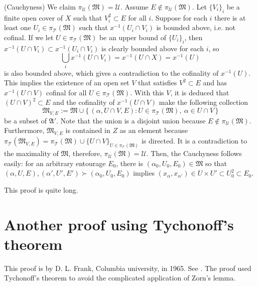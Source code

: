 \documentclass[11pt]{amsart}
\begin{document}
\begin{pf}[1 of Theorem 1.1]
(Cauchyness)
We claim $\pi_\mathcal{U}(\mathfrak{M})=\mathcal{U}$.
Assume $E\notin\pi_\mathcal{U}(\mathfrak{M})$.
Let $\{V_i\}_i$ be a finite open cover of $X$ such that $V_i^2\subset E$ for all $i$.
Suppose for each $i$ there is at least one $U_i\in\pi_\mathcal{T}(\mathfrak{M})$ such that $x^{-1}(U_i\cap V_i)$ is bounded above, i.e. not cofinal.
If we let $U\in\pi_\mathcal{T}(\mathfrak{M})$ be an upper bound of $\{U_i\}_i$, then $x^{-1}(U\cap V_i)\subset x^{-1}(U_i\cap V_i)$ is clearly bounded above for each $i$, so
\[\bigcup_ix^{-1}(U\cap V_i)=x^{-1}(U\cap X)=x^{-1}(U)\]
is also bounded above, which gives a contradiction to the cofinality of $x^{-1}(U)$.
This implies the existence of an open set $V$ that satisfies $V^2\subset E$ and has $x^{-1}(U\cap V)$ cofinal for all $U\in\pi_\mathcal{T}(\mathfrak{M})$.
With this $V$, it is deduced that $(U\cap V)^2\subset E$ and the cofinality of $x^{-1}(U\cap V)$ make the following collection
\[\mathfrak{M}_{V,E}:=\mathfrak{M}\cup\{\,(\alpha,U\cap V,E):U\in\pi_\mathcal{T}(\mathfrak{M}),\ \alpha\in U\cap V\,\}\]
be a subset of $\mathfrak{A}'$.
Note that the union is a disjoint union because $E\notin\pi_\mathcal{U}(\mathfrak{M})$.
Furthermore, $\mathfrak{M}_{V,E}$ is contained in $Z$ as an element because $\pi_\mathcal{T}(\mathfrak{M}_{V,E})=\pi_\mathcal{T}(\mathfrak{M})\cup\{U\cap V\}_{U\in\pi_\mathcal{T}(\mathfrak{M})}$ is directed.
It is a contradiction to the maximality of $\mathfrak{M}$, therefore, $\pi_\mathcal{U}(\mathfrak{M})=\mathcal{U}$.
Then, the Cauchyness follows easily: for an arbitrary entourage $E_0$, there is $(\alpha_0,U_0,E_0)\in\mathfrak{M}$ so that $(\alpha,U,E),(\alpha',U',E')\succ(\alpha_0,U_0,E_0)$ implies $(x_\alpha,x_{\alpha'})\in U\times U'\subset U_0^2\subset E_0$.
\end{pf}

This proof is quite long.






\section{Another proof using Tychonoff's theorem}

This proof is by D. L. Frank, Columbia university, in 1965.
See \cite{frank1965totally}.
The proof used Tychonoff's theorem to avoid the complicated application of Zorn's lemma.
\end{document}
